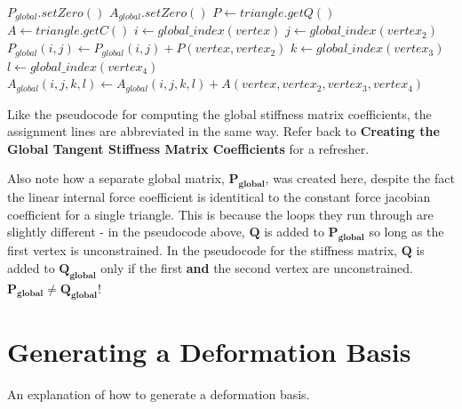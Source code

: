 \documentclass[twocolumn,10pt]{asme2ej}
\begin{document}
\begin{algorithmic}[1]
        \State $P_{global}.setZero()$
        \State $A_{global}.setZero()$
         \State $P \gets triangle.getQ()$
         \State $A \gets triangle.getC()$
                  \State $i \gets global\_index(vertex)$
                    \State $j \gets global\_index(vertex_2)$
                    \State $P_{global}(i,j) \gets P_{global}(i,j) + P(vertex, vertex_2)$
                          \State $k \gets global\_index(vertex_3)$
                              \State $l \gets global\_index(vertex_4)$
                              \State $A_{global}(i,j,k,l)  \gets A_{global}(i,j,k,l)+A(vertex, vertex_2, vertex_3, vertex_4)$
                            \EndFor
                      \EndFor
                    \EndFor
              \EndIf
            \EndFor
        \EndFor
    \EndFunction
\end{algorithmic}

Like the pseudocode for computing the global stiffness matrix coefficients, the assignment lines are abbreviated in the same way. Refer back to \textbf{Creating the Global Tangent Stiffness Matrix Coefficients} for a refresher.

Also note how a separate global matrix, $\bm{P_{global}}$, was created here, despite the fact the linear internal force coefficient is identitical to the constant force jacobian coefficient for a single triangle. This is because the loops they run through are slightly different - in the pseudocode above, $\bm{Q}$ is added to $\bm{P_{global}}$ so long as the first vertex is unconstrained. In the pseudocode for the stiffness matrix, $\bm{Q}$ is added to $\bm{Q_{global}}$ only if the first \textbf{and} the second vertex are unconstrained. $\bm{P_{global}} \neq \bm{Q_{global}}$!

\section{Generating a Deformation Basis}

An explanation of how to generate a deformation basis.
\end{document}
